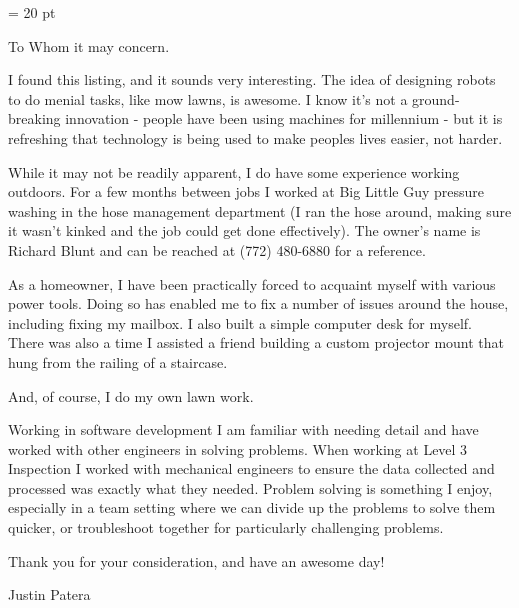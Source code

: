 \parindent = 20 pt

\noindent To Whom it may concern.

I found this listing, and it sounds very interesting.
The idea of designing robots to do menial tasks, like mow lawns, is awesome.
I know it's not a ground-breaking innovation - people have been using machines for millennium - but it is refreshing that technology is being used to make peoples lives easier, not harder.

While it may not be readily apparent, I do have some experience working outdoors.
For a few months between jobs I worked at Big Little Guy pressure washing in the hose management department (I ran the hose around, making sure it wasn't kinked and the job could get done effectively).
The owner's name is Richard Blunt and can be reached at (772) 480-6880 for a reference.

As a homeowner, I have been practically forced to acquaint myself with various power tools.
Doing so has enabled me to fix a number of issues around the house, including fixing my mailbox.
I also built a simple computer desk for myself.
There was also a time I assisted a friend building a custom projector mount that hung from the railing of a staircase.

And, of course, I do my own lawn work.

Working in software development I am familiar with needing detail and have worked with other engineers in solving problems.
When working at Level 3 Inspection I worked with mechanical engineers to ensure the data collected and processed was exactly what they needed.
Problem solving is something I enjoy, especially in a team setting where we can divide up the problems to solve them quicker, or troubleshoot together for particularly challenging problems.

Thank you for your consideration, and have an awesome day!

Justin Patera

